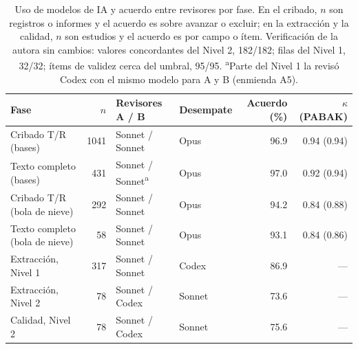\begin{table}[!tbp]
\centering
\caption{Uso de modelos de IA y acuerdo entre revisores por fase. En el cribado, $n$ son registros o informes y el acuerdo es sobre avanzar o excluir; en la extracción y la calidad, $n$ son estudios y el acuerdo es por campo o ítem. Verificación de la autora sin cambios: valores concordantes del Nivel 2, 182/182; filas del Nivel 1, 32/32; ítems de validez cerca del umbral, 95/95. \textsuperscript{a}Parte del Nivel 1 la revisó Codex con el mismo modelo para A y B (enmienda A5).}
\label{tab:ia}
\footnotesize
\begin{tabular}{@{}l r l l r r@{}}
\toprule
Fase & $n$ & Revisores A / B & Desempate & Acuerdo (\%) & $\kappa$ (PABAK) \\
\midrule
Cribado T/R (bases) & 1041 & Sonnet / Sonnet & Opus & \num{96.9} & \num{0.94} (\num{0.94}) \\
Texto completo (bases) & 431 & Sonnet / Sonnet\textsuperscript{a} & Opus & \num{97.0} & \num{0.92} (\num{0.94}) \\
Cribado T/R (bola de nieve) & 292 & Sonnet / Sonnet & Opus & \num{94.2} & \num{0.84} (\num{0.88}) \\
Texto completo (bola de nieve) & 58 & Sonnet / Sonnet & Opus & \num{93.1} & \num{0.84} (\num{0.86}) \\
Extracción, Nivel 1 & 317 & Sonnet / Sonnet & Codex & \num{86.9} & --- \\
Extracción, Nivel 2 & 78 & Sonnet / Codex & Sonnet & \num{73.6} & --- \\
Calidad, Nivel 2 & 78 & Sonnet / Codex & Sonnet & \num{75.6} & --- \\
\bottomrule
\end{tabular}
\end{table}
